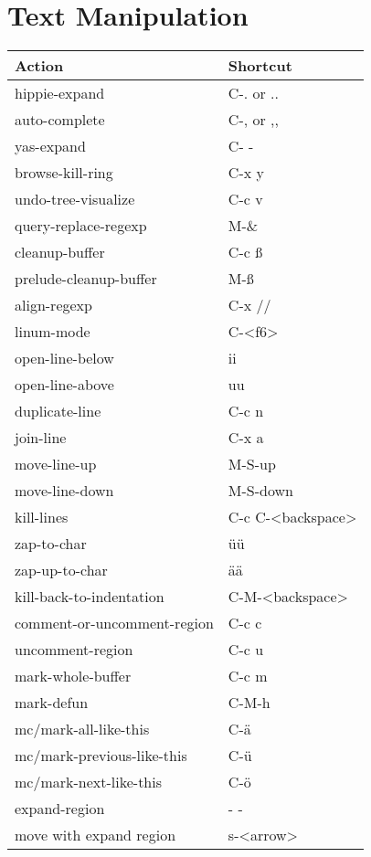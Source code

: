 \documentclass[english]{rcalibrionecolumn}
\begin{document}
\section{Text Manipulation}
\label{sec-10}


\begin{center}
\begin{tabular}{ll}
 \textbf{Action}              &  \textbf{Shortcut}  \\
\hline
 hippie-expand                &  C-. or ..          \\
 auto-complete                &  C-, or ,,          \\
 yas-expand                   &  C- -               \\
\hline
 browse-kill-ring             &  C-x y              \\
 undo-tree-visualize          &  C-c v              \\
 query-replace-regexp         &  M-\&               \\
 cleanup-buffer               &  C-c ß              \\
 prelude-cleanup-buffer       &  M-ß                \\
 align-regexp                 &  C-x //             \\
 linum-mode                   &  C-<f6>             \\
\hline
 open-line-below              &  ii                 \\
 open-line-above              &  uu                 \\
 duplicate-line               &  C-c n              \\
 join-line                    &  C-x a              \\
 move-line-up                 &  M-S-up             \\
 move-line-down               &  M-S-down           \\
 kill-lines                   &  C-c C-<backspace>  \\
\hline
 zap-to-char                  &  üü                 \\
 zap-up-to-char               &  ää                 \\
 kill-back-to-indentation     &  C-M-<backspace>    \\
\hline
 comment-or-uncomment-region  &  C-c c              \\
 uncomment-region             &  C-c u              \\
\hline
 mark-whole-buffer            &  C-c m              \\
 mark-defun                   &  C-M-h              \\
 mc/mark-all-like-this        &  C-ä                \\
 mc/mark-previous-like-this   &  C-ü                \\
 mc/mark-next-like-this       &  C-ö                \\
 expand-region                &  - -                \\
 move with expand region      &  s-<arrow>          \\
\end{tabular}
\end{center}
\end{document}
